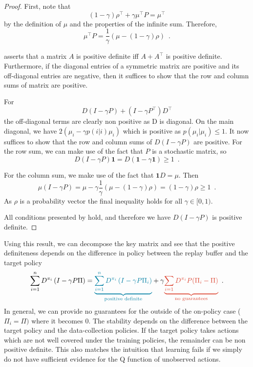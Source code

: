 \begin{proof}
    First, note that $$(1 - \gamma) \rho^\top + \gamma \mu^\top P = \mu^\top$$ by the definition of $\mu$ and the properties of the infinite sum.
    Therefore, $$\mu^\top P = \frac{1}{\gamma}\left(\mu - (1 - \gamma) \rho\right)\enspace.$$

    \textcite{sutton1988learning} asserts that a matrix $A$ is positive definite iff $A + A^\top$ is positive definite.
    Furthermore, if the diagonal entries of a symmetric matrix are positive and its off-diagonal entries are negative, then it suffices to show that the row and column sums of matrix are positive.

    For $$D(I - \gamma P) + (I - \gamma P^\top) D^\top$$ the off-diagonal terms are clearly non positive as D is diagonal.
    On the main diagonal, we have $2(\mu_i - \gamma p(i|i)\mu_i)$ which is positive as $p(\mu_i|\mu_i) \leq 1$.
    It now suffices to show that the row and column sums of $D(I - \gamma P)$ are positive.
    For the row sum, we can make use of the fact that $P$ is a stochastic matrix, so $$D(I-\gamma P)\mathbf{1} = D(\mathbf{1} - \gamma\mathbf{1}) \geq 1\enspace.$$

    For the column sum, we make use of the fact that $\mathbf{1}D = \mu$.
    Then $$\mu(I - \gamma P) = \mu - \gamma \frac{1}{\gamma}\left(\mu - (1 - \gamma) \rho\right) = (1-\gamma)\rho \geq 1\enspace.$$
    As $\rho$ is a probability vector the final inequality holds for all $\gamma \in [0,1)$.
    
    All conditions presented by \textcite{sutton1988learning} hold, and therefore we have $D(I-\gamma P)$ is positive definite.
\end{proof}

Using this result, we can decompose the key matrix and see that the positive definiteness depends on the difference in policy between the replay buffer and the target policy
\begin{align}
    \sum_{i=1}^n D^{\pi_i} \left(I - \gamma P\Pi \right) = \blue{\underbrace{\sum_{i=1}^n D^{\pi_i} \left(I - \gamma P\Pi_i \right)}_{\text{positive definite}}} + \gamma \red{\underbrace{\sum_{i=1} D^{\pi_i}P (\Pi_i - \Pi)}_{\text{no guarantees}}} \enspace .
\end{align}
In general, we can provide no guarantees for the  outside of the on-policy case ($\Pi_i = \Pi)$ where it becomes $0$.
The stability depends on the difference between the target policy and the data-collection policies.
If the target policy takes actions which are not well covered under the training policies, the remainder can be non positive definite.
This also matches the intuition that learning fails if we simply do not have sufficient evidence for the Q function of unobserved actions.

